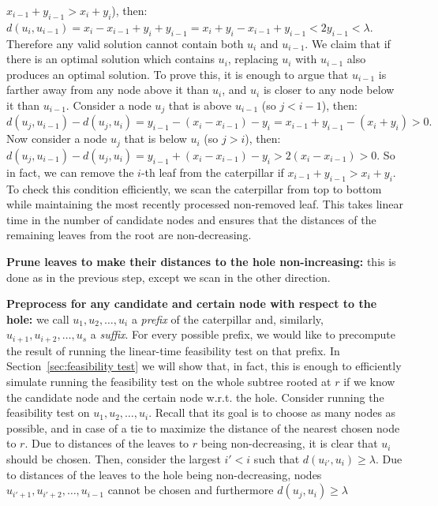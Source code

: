 \documentclass[11pt,a4paper]{article}
\newcounter{mycounter}
\newenvironment{noindlist}
 {\begin{list}{\arabic{mycounter}.~~}{\usecounter{mycounter} \labelsep=0em \labelwidth=0em \leftmargin=0em \itemindent=0em}}
 {\end{list}}
\theoremstyle{definition}
\theoremstyle{remark}
\begin{document}
\begin{noindlist}
$x_{i-1}+y_{i-1} > x_i+y_i$), then:
$d(u_{i},u_{i-1}) = x_i-x_{i-1}+y_i+y_{i-1} = x_{i} + y_{i} - x_{i-1} + y_{i-1} < 2y_{i-1} < \lambda.$
Therefore any valid solution cannot contain both $u_{i}$ and $u_{i-1}$. We claim that if there is an optimal solution which contains
$u_{i}$, replacing $u_{i}$ with $u_{i-1}$ also produces an optimal solution. To prove this, it is enough to argue that
$u_{i-1}$ is farther away from any node above it than $u_i$, and $u_i$ is closer to any node below it than $u_{i-1}$.
Consider a node $u_{j}$ that is above $u_{i-1}$ (so $j<i-1$), then:
$d(u_j,u_{i-1}) - d(u_j,u_{i}) = y_{i-1}-(x_i-x_{i-1})-y_i = x_{i-1}+y_{i-1}-(x_i+y_i) > 0.$
Now consider a node $u_{j}$ that is below $u_{i}$ (so $j>i$), then:
$d(u_j,u_{i-1}) - d(u_j,u_{i}) = y_{i-1}+(x_i-x_{i-1})-y_i > 2(x_i-x_{i-1}) > 0.$
So in fact, we can remove the $i$-th leaf from the caterpillar if $x_{i-1}+y_{i-1} > x_i+y_i$.
To check this condition efficiently, we scan the caterpillar from top to bottom while maintaining the most recently processed non-removed leaf.
This takes linear time in the number of candidate nodes and ensures that the distances of the
remaining leaves from the root are non-decreasing.
\item\label{making distances from the hole monotone}
\textbf{Prune leaves to make their distances to the hole non-increasing:}
this is done as in the previous step, except we scan in the other direction.
\item\label{precompute for any candidate node}
\textbf{Preprocess for any candidate and certain node with respect to the hole:}
we call $u_{1},u_{2},\ldots,u_{i}$ a {\em prefix} of the caterpillar and, similarly, $u_{i+1},u_{i+2}, \ldots,u_{s}$ a {\em suffix}.
For every possible prefix, we would like to precompute the result of running the linear-time feasibility
test on that prefix. In Section~\ref{sec:feasibility test} we will show that, in fact, this is enough to efficiently
simulate running the feasibility test on the whole subtree rooted at $r$ if we know the candidate node and the certain node w.r.t. the hole. Consider running the feasibility test on $u_{1},u_{2},\ldots,u_{i}$.
Recall that its goal is to choose as many nodes as possible, and in case of a tie to maximize the distance of the
nearest chosen node to $r$. Due to distances of the leaves to $r$ being non-decreasing, it is clear that
$u_{i}$ should be chosen. Then, consider the largest $i'<i$ such that $d(u_{i'},u_{i})\geq \lambda$.
Due to distances of the leaves to the hole
being non-decreasing, nodes $u_{i'+1},u_{i'+2},\ldots,u_{i-1}$ cannot be chosen and furthermore $d(u_{j},u_{i})\geq \lambda$

\end{noindlist}
\end{document}
